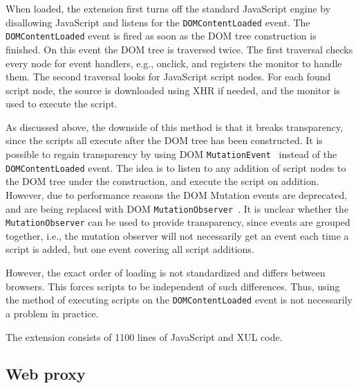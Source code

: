 \documentclass{llncs}
\begin{document}
When loaded, the extension first turns off the standard JavaScript engine by
disallowing JavaScript and listens for the \lstinline{DOMContentLoaded} event.  The
\lstinline{DOMContentLoaded} event is fired as soon as the DOM tree construction is
finished.  On this event the DOM tree is traversed twice. The first traversal
checks every node for event handlers, e.g., onclick, and registers the monitor
to handle them. The second traversal looks for JavaScript script nodes.  For
each found script node, the source is downloaded using XHR if needed, and the
monitor is used to execute the script.

As discussed above, the downside of this method is that it breaks
transparency, since the scripts all execute after the DOM
tree has been constructed. It is possible to regain transparency by using DOM
\lstinline{MutationEvent}~\cite{DOM3Event} instead of the \lstinline{DOMContentLoaded} event.  The idea is to listen
to any addition of script nodes to the DOM tree under the construction, and
execute the script on addition.  However, due to performance reasons the DOM
Mutation events are deprecated, and are being replaced with DOM \lstinline{MutationObserver}~\cite{DOM4}. 
It is unclear whether the \lstinline{MutationObserver} can be used to
provide transparency, since events are grouped together, i.e., the mutation
observer will not necessarily get an event each time a script is added, but one
event covering all script additions.

However, the exact order of loading is not standardized and differs between
browsers. This forces scripts to be independent of such differences. Thus,
using the method of executing scripts on the \lstinline{DOMContentLoaded} event is not
necessarily a problem in practice. 

The extension consists of 1100 lines of JavaScript and XUL code.




\subsection{Web proxy}

\end{document}
